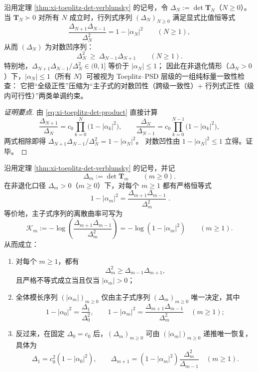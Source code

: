 \begin{corollary}\label{cor:xi-toeplitz-principal-minor-logconcavity}
沿用定理 \ref{thm:xi-toeplitz-det-verblunsky} 的记号，令 \(\Delta_N:=\det\mathbf{T}_N\)（\(N\ge 0\)）。
当 \(\mathbf{T}_N\succ 0\) 对所有 \(N\) 成立时，行列式序列 \((\Delta_N)_{N\ge 0}\) 满足显式比值恒等式
\[
\boxed{\;
\frac{\Delta_{N+1}\Delta_{N-1}}{\Delta_N^{2}}=1-|\alpha_N|^2\qquad(N\ge 1),\;}
\]
从而 \((\Delta_N)\) 为对数凹序列：
\[
\boxed{\;
\Delta_N^2\ \ge\ \Delta_{N-1}\Delta_{N+1}\qquad(N\ge 1).\;}
\]
特别地，\(\Delta_{N+1}\Delta_{N-1}/\Delta_N^2\in(0,1]\) 等价于 \(|\alpha_N|\le 1\)；
因此在非退化情形（\(\Delta_N>0\)）下，\(|\alpha_N|\le 1\)（所有 \(N\)）可被视为 Toeplitz--PSD 层级的一组纯标量一致性检查：
它把“全级正性”压缩为“主子式的对数凹性（跨级一致性）+ 行列式正性（级内可行性）”两类单调约束。
\end{corollary}
\begin{proof}[证明要点]
由 \eqref{eq:xi-toeplitz-det-product} 直接计算
\[
\frac{\Delta_{N+1}}{\Delta_N}
=c_0\prod_{k=0}^{N}\bigl(1-|\alpha_k|^2\bigr),
\qquad
\frac{\Delta_{N}}{\Delta_{N-1}}
=c_0\prod_{k=0}^{N-1}\bigl(1-|\alpha_k|^2\bigr),
\]
两式相除即得 \(\Delta_{N+1}\Delta_{N-1}/\Delta_N^2=1-|\alpha_N|^2\)。
对数凹性由 \(1-|\alpha_N|^2\le 1\) 立得。证毕。
\end{proof}

\begin{theorem}\label{thm:xi-toeplitz-principal-minor-discrete-curvature-recovery}
沿用定理 \ref{thm:xi-toeplitz-det-verblunsky} 的记号，并记
\[
\Delta_m:=\det\mathbf{T}_m\qquad(m\ge 0).
\]
在非退化口径 \(\Delta_m>0\)（\(m\ge 0\)）下，对每个 \(m\ge 1\) 都有严格恒等式
\begin{equation}\label{eq:xi-toeplitz-principal-minor-discrete-curvature}
\boxed{\;
1-|\alpha_m|^2
=
\frac{\Delta_{m+1}\Delta_{m-1}}{\Delta_m^2}\; }.
\end{equation}
等价地，主子式序列的离散曲率可写为
\[
\mathcal K_m:=-\log\!\left(\frac{\Delta_{m+1}\Delta_{m-1}}{\Delta_m^2}\right)
=-\log(1-|\alpha_m|^2)
\qquad(m\ge 1).
\]
从而成立：
\begin{enumerate}
  \item 对每个 \(m\ge 1\)，都有
  \[
  \Delta_m^2\ge \Delta_{m-1}\Delta_{m+1},
  \]
  且严格不等式成立当且仅当 \(|\alpha_m|>0\)；
  \item 全体模长序列 \((|\alpha_m|)_{m\ge 0}\) 仅由主子式序列 \((\Delta_m)_{m\ge 0}\) 唯一决定，其中
  \[
  1-|\alpha_0|^2=\frac{\Delta_1}{\Delta_0^2},
  \qquad
  1-|\alpha_m|^2=\frac{\Delta_{m+1}\Delta_{m-1}}{\Delta_m^2}\quad(m\ge 1);
  \]
  \item 反过来，在固定 \(\Delta_0=c_0\) 后，\((\Delta_m)_{m\ge 0}\) 可由 \((|\alpha_m|)_{m\ge 0}\) 递推唯一恢复，具体为
  \[
  \Delta_1=c_0^2(1-|\alpha_0|^2),
  \qquad
  \Delta_{m+1}=(1-|\alpha_m|^2)\frac{\Delta_m^2}{\Delta_{m-1}}
  \quad(m\ge 1).
  \]
\end{enumerate}
\end{theorem}

